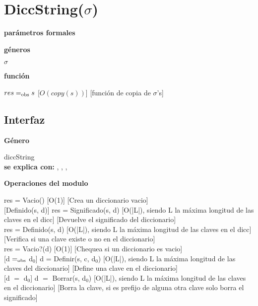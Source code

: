 \section{DiccString($\sigma$)}

\textbf{parámetros formales}\parindent\\
\parbox{1.7cm}{\textbf{géneros}}  $\sigma$\\
\parbox[t]{1.7cm}{\textbf{función}}\parbox[t]{\textwidth-2\parindent-1.7cm}{%
{$res =_{\mathrm{obs}} s$}
[$O(copy(s))$]
[función de copia de $\sigma$'s]
}

\subsection{Interfaz}

\parbox {1,7cm}{{\bf Género}} diccString\\
{\bf se explica con:}  , , , \\
\medskip

\bf{Operaciones del modulo}

{res = Vacio()}
[O(1)]
[Crea un diccionario vacio]\\

[Definido(s, d)]
{res = Significado(s, d)}
[O(|L|), siendo L la máxima longitud de las claves en el dicc]
[Devuelve el significado del diccionario]\\

{res = Definido(s, d)}
[O(|L|), siendo L la máxima longitud de las claves en el dicc]
[Verifica si una clave existe o no en el diccionario]\\

{res = Vacio?(d)}
[O(1)]
[Chequea si un diccionario es vacio]\\

[d $=_{\mathrm{obs}}$ d$_0$]
{d = Definir(s, c, d$_0$)}
[O(|L|), siendo L la máxima longitud de las claves del diccionario]
[Define una clave en el diccionario]\\

[d $=$ d$_0$]
{d $=$ Borrar(s, d$_0$)}
[O(|L|), siendo L la máxima longitud de las claves en el diccionario]
[Borra la clave, si es prefijo de alguna otra clave solo borra el significado]\\

